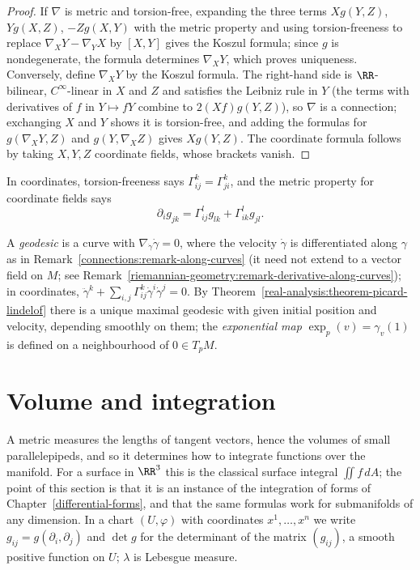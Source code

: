 \begin{proof}
If $\nabla$ is metric and torsion-free, expanding the three terms $Xg(Y, Z)$, $Yg(X, Z)$, $-Zg(X, Y)$ with the metric property and using torsion-freeness to replace $\nabla_XY - \nabla_YX$ by $[X, Y]$ gives the
Koszul formula; since $g$ is nondegenerate, the formula determines $\nabla_XY$, which proves uniqueness. Conversely, define $\nabla_XY$ by the Koszul formula. The right-hand side is $\RR$-bilinear,
$C^\infty$-linear in $X$ and $Z$ and satisfies the Leibniz rule in $Y$ (the terms with derivatives of $f$ in $Y \mapsto fY$ combine to $2(Xf)g(Y, Z)$), so $\nabla$ is a connection; exchanging $X$ and $Y$ shows it
is torsion-free, and adding the formulas for $g(\nabla_XY, Z)$ and $g(Y, \nabla_XZ)$ gives $Xg(Y, Z)$. The coordinate formula follows by taking $X, Y, Z$ coordinate fields, whose brackets vanish.
\end{proof}

In coordinates, torsion-freeness says $\Gamma^k_{ij} = \Gamma^k_{ji}$, and the metric property for coordinate fields says
\begin{equation}\label{riemannian-geometry:equation-metric-christoffel}
\partial_ig_{jk} = \Gamma^l_{ij}g_{lk} + \Gamma^l_{ik}g_{jl}.
\end{equation}

\begin{definition}\label{riemannian-geometry:definition-geodesic}
A \emph{geodesic} is a curve with $\nabla_{\dot\gamma}\dot\gamma = 0$, where the velocity $\dot\gamma$ is differentiated along $\gamma$ as in
Remark~\ref{connections:remark-along-curves} (it need not extend to a vector field on $M$; see
Remark~\ref{riemannian-geometry:remark-derivative-along-curves}); in coordinates, $\ddot\gamma^k + \sum_{i,j}\Gamma^k_{ij}\dot\gamma^i\dot\gamma^j = 0$. By
Theorem~\ref{real-analysis:theorem-picard-lindelof} there is a unique maximal geodesic with given initial position and velocity, depending smoothly on them; the \emph{exponential map}
$\exp_p(v) = \gamma_v(1)$ is defined on a neighbourhood of $0 \in T_pM$.
\end{definition}

\section{Volume and integration}\label{riemannian-geometry:section-volume}

A metric measures the lengths of tangent vectors, hence the volumes of small parallelepipeds, and so it determines how to integrate functions over the manifold.
For a surface in $\RR^3$ this is the classical surface integral $\iint f\,dA$; the point of this section is that it is an instance of the integration of forms of
Chapter~\ref{differential-forms}, and that the same formulas work for submanifolds of any dimension. In a chart $(U, \varphi)$ with coordinates $x^1, \ldots, x^n$ we write
$g_{ij} = g(\partial_i, \partial_j)$ and $\det g$ for the determinant of the matrix $(g_{ij})$, a smooth positive function on $U$; $\lambda$ is Lebesgue measure.

